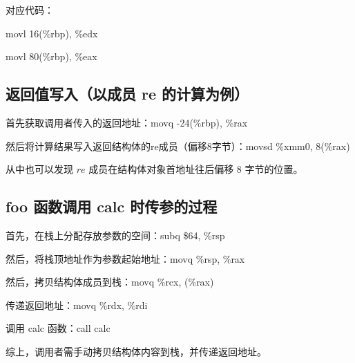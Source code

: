 \documentclass{article}
\begin{document}
对应代码：

movl 16(\%rbp), \%edx

movl 80(\%rbp), \%eax

\subsection{返回值写入（以成员 re 的计算为例）}
首先获取调用者传入的返回地址：movq -24(\%rbp), \%rax

然后将计算结果写入返回结构体的re成员（偏移8字节）：movsd \%xmm0, 8(\%rax)

从中也可以发现 $re$ 成员在结构体对象首地址往后偏移 $8$ 字节的位置。

\subsection{foo 函数调用 calc 时传参的过程}
首先，在栈上分配存放参数的空间：subq \$64, \%rsp 

然后，将栈顶地址作为参数起始地址：movq \%rsp, \%rax 

然后，拷贝结构体成员到栈：movq \%rcx, (\%rax) 

传递返回地址：movq \%rdx, \%rdi 

调用 calc 函数：call calc

综上，调用者需手动拷贝结构体内容到栈，并传递返回地址。
\end{document}
